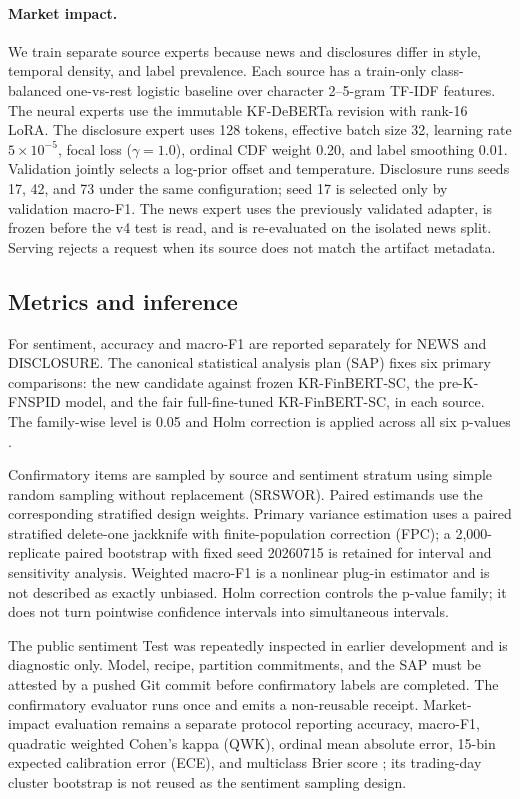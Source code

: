 \documentclass[11pt]{article}
\begin{document}
\paragraph{Market impact.}
We train separate source experts because news and disclosures differ in style, temporal density, and label prevalence. Each source has a train-only class-balanced one-vs-rest logistic baseline over character 2--5-gram TF-IDF features. The neural experts use the immutable KF-DeBERTa revision with rank-16 LoRA. The disclosure expert uses 128 tokens, effective batch size 32, learning rate $5\times10^{-5}$, focal loss ($\gamma=1.0$), ordinal CDF weight 0.20, and label smoothing 0.01. Validation jointly selects a log-prior offset and temperature. Disclosure runs seeds 17, 42, and 73 under the same configuration; seed 17 is selected only by validation macro-F1. The news expert uses the previously validated adapter, is frozen before the v4 test is read, and is re-evaluated on the isolated news split. Serving rejects a request when its source does not match the artifact metadata.

\subsection{Metrics and inference}

For sentiment, accuracy and macro-F1 are reported separately for NEWS and DISCLOSURE. The canonical statistical analysis plan (SAP) fixes six primary comparisons: the new candidate against frozen KR-FinBERT-SC, the pre-K-FNSPID model, and the fair full-fine-tuned KR-FinBERT-SC, in each source. The family-wise level is 0.05 and Holm correction is applied across all six p-values \citep{holm-1979}.

Confirmatory items are sampled by source and sentiment stratum using simple random sampling without replacement (SRSWOR). Paired estimands use the corresponding stratified design weights. Primary variance estimation uses a paired stratified delete-one jackknife with finite-population correction (FPC); a 2,000-replicate paired bootstrap with fixed seed 20260715 is retained for interval and sensitivity analysis. Weighted macro-F1 is a nonlinear plug-in estimator and is not described as exactly unbiased. Holm correction controls the p-value family; it does not turn pointwise confidence intervals into simultaneous intervals.

The public sentiment Test was repeatedly inspected in earlier development and is diagnostic only. Model, recipe, partition commitments, and the SAP must be attested by a pushed Git commit before confirmatory labels are completed. The confirmatory evaluator runs once and emits a non-reusable receipt. Market-impact evaluation remains a separate protocol reporting accuracy, macro-F1, quadratic weighted Cohen's kappa (QWK), ordinal mean absolute error, 15-bin expected calibration error (ECE), and multiclass Brier score \citep{guo-etal-2017-calibration}; its trading-day cluster bootstrap is not reused as the sentiment sampling design.
\end{document}
